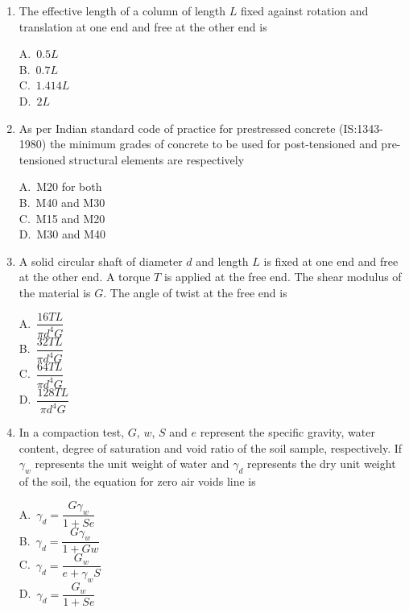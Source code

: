 \documentclass[journal,12pt,onecolumn]{exam}
\theoremstyle{remark}
\begin{document}
\begin{enumerate}
\noindent\item The effective length of a column of length $L$ fixed against rotation and translation at one end and free at the other end is \hfill{}
\begin{multicols}{4}
A.\ $0.5L$ \\
B.\ $0.7L$ \\
C.\ $1.414L$ \\
D.\ $2L$
\end{multicols}

\raggedright
\noindent\item As per Indian standard code of practice for prestressed concrete (IS:1343-1980) the minimum grades of concrete to be used for post-tensioned and pre-tensioned structural elements are respectively 
\hfill{}
\begin{multicols}{4}
A.\ M20 for both \\
B.\ M40 and M30 \\
C.\ M15 and M20 \\
D.\ M30 and M40
\end{multicols}

\noindent\item A solid circular shaft of diameter $d$ and length $L$ is fixed at one end and free at the other end. A torque $T$ is applied at the free end. The shear modulus of the material is $G$. The angle of twist at the free end is 
\hfill{}
\begin{multicols}{4}
A.\ $\dfrac{16TL}{\pi d^4 G}$ \\
B.\ $\dfrac{32TL}{\pi d^4 G}$ \\
C.\ $\dfrac{64TL}{\pi d^4 G}$ \\
D.\ $\dfrac{128TL}{\pi d^4 G}$
\end{multicols}

\noindent\item In a compaction test, $G$, $w$, $S$ and $e$ represent the specific gravity, water content, degree of saturation and void ratio of the soil sample, respectively. If $\gamma_w$ represents the unit weight of water and $\gamma_d$ represents the dry unit weight of the soil, the equation for zero air voids line is 
\\ \hfill{}
\begin{multicols}{4}
A.\ $\gamma_d = \dfrac{G \gamma_w}{1+Se}$ \\
B.\ $\gamma_d = \dfrac{G \gamma_w}{1+Gw}$ \\
C.\ $\gamma_d = \dfrac{G_w}{e+\gamma_w S}$ \\
D.\ $\gamma_d = \dfrac{G_w}{1+Se}$
\end{multicols}


\end{enumerate}
\end{document}
